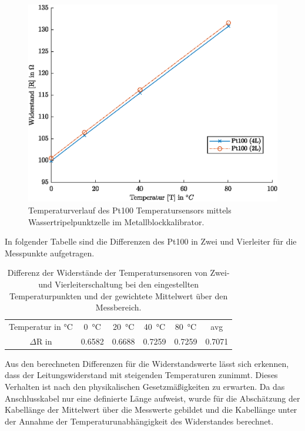 \begin{figure}[H]
	\centering
	\includegraphics[height=0.2\textheight]{../MLAB/Vergleich2L4L.eps}
	\caption[Temperaturverlauf des Pt100 Temperatursensors mittels Wassertripelpunktzelle]{ Temperaturverlauf des Pt100 Temperatursensors mittels Wassertripelpunktzelle im Metallblockkalibrator.}
	\label{fig:2L4L}
\end{figure}

In folgender Tabelle sind die Differenzen des Pt100 in Zwei und Vierleiter für die Messpunkte aufgetragen.

\begin{table}[H]
	\centering
	\caption{Differenz der Widerstände der Temperatursensoren von Zwei- und Vierleiterschaltung bei den eingestellten Temperaturpunkten und der gewichtete Mittelwert über den Messbereich.}
	\label{tab:Vergleich}
	\begin{tabular}{cccccc}
		Temperatur in \si{\celsius}& \SI{0}{\celsius} & \SI{20}{\celsius} & \SI{40}{\celsius}&\SI{80}{\celsius} & avg\\ 
		$\Delta$R in \ohm & \num{0,6582} & \num{0.6688} &  \num{0,7259}& \num{0,7259}& \num{0.7071} \\
	\end{tabular} 
\end{table}

Aus den berechneten Differenzen für die Widerstandswerte lässt sich erkennen, dass der Leitungswiderstand mit steigenden Temperaturen zunimmt. Dieses Verhalten ist nach den physikalischen Gesetzmäßigkeiten zu erwarten. Da das Anschlusskabel nur eine definierte Länge aufweist, wurde für die Abschätzung der Kabellänge der Mittelwert über die Messwerte gebildet und die Kabellänge unter der Annahme der Temperaturunabhängigkeit des Widerstandes berechnet. 

